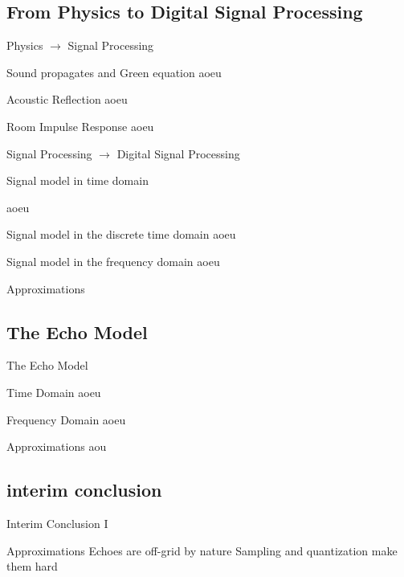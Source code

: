 \subsection{From Physics to Digital Signal Processing}

\begin{frame}{Physics $\longrightarrow$ Signal Processing}

    \begin{block}{Sound propagates and Green equation}
        aoeu
    \end{block}

    \begin{block}{Acoustic Reflection}
        aoeu
    \end{block}

    \begin{block}{Room Impulse Response}
        aoeu
    \end{block}

\end{frame}

\begin{frame}{Signal Processing $\longrightarrow$ \alert{Digital} Signal Processing}
    \begin{block}{Signal model in time domain}
    \end{block}
    aoeu

    \begin{block}{Signal model in the discrete time domain}
        aoeu
    \end{block}

    \begin{block}{Signal model in the frequency domain}
        aoeu
    \end{block}

    \begin{block}{Approximations}

    \end{block}

\end{frame}

\subsection{The Echo Model}
\begin{frame}{The Echo Model}
    \begin{block}{Time Domain}
        aoeu
    \end{block}

    \begin{block}{Frequency Domain}
        aoeu
    \end{block}

    \begin{block}{Approximations}
        aou
    \end{block}

\end{frame}

\subsection*{interim conclusion}
\begin{frame}{Interim Conclusion I}
    \begin{alertblock}{Approximations}
        Echoes are off-grid by nature
        Sampling and quantization make them hard
    \end{alertblock}
\end{frame}
